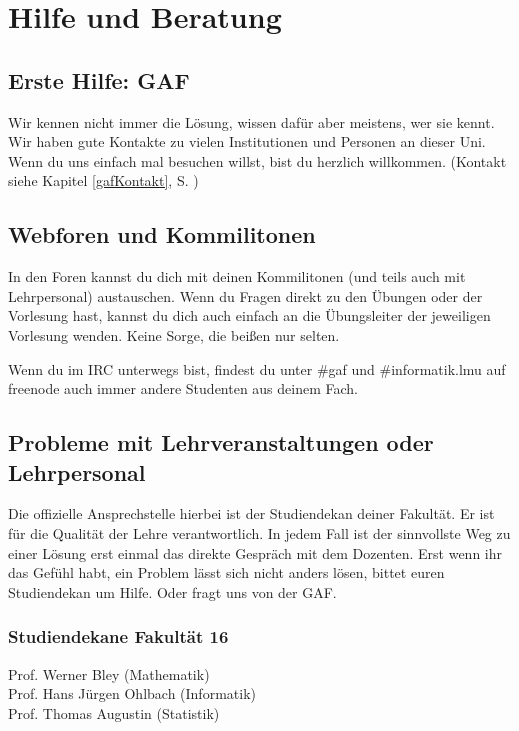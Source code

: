 ﻿\chapter{Hilfe und Beratung}

\section{Erste Hilfe: GAF}

Wir kennen nicht immer die Lösung, wissen dafür aber meistens, wer sie
kennt. Wir haben gute Kontakte zu vielen Institutionen und Personen an
dieser Uni. Wenn du uns einfach mal besuchen willst, bist du herzlich
willkommen. (Kontakt siehe Kapitel \ref{gafKontakt}, S. \pageref{gafKontakt})


\section{Webforen und Kommilitonen}

In den Foren kannst du dich mit deinen Kommilitonen
(und teils auch mit Lehrpersonal) austauschen. Wenn du Fragen direkt zu den
Übungen oder der Vorlesung hast, kannst du dich auch einfach an die
Übungsleiter der jeweiligen Vorlesung wenden. Keine Sorge, die beißen nur
selten.

Wenn du im IRC unterwegs bist, findest du unter \#gaf und \#informatik.lmu auf
freenode auch immer andere Studenten aus deinem Fach.

\begin{urlList}
\end{urlList}


\section{Probleme mit Lehrveranstaltungen oder Lehrpersonal}

Die offizielle Ansprechstelle hierbei ist der Studiendekan deiner
Fakultät. Er ist für die Qualität der Lehre verantwortlich. In jedem
Fall ist der sinnvollste Weg zu einer Lösung erst einmal das direkte
Gespräch mit dem Dozenten. Erst wenn ihr das Gefühl habt, ein Problem
lässt sich nicht anders lösen, bittet euren Studiendekan um
Hilfe. Oder fragt uns von der GAF.

\subsection*{Studiendekane Fakultät 16}
Prof. Werner Bley (Mathematik)\subjectList{\subjectM\subjectW}\\ %
Prof. Hans Jürgen Ohlbach (Informatik)\subjectList{\subjectI\subjectMI}\\
Prof. Thomas Augustin (Statistik)\subjectList{\subjectS}%

